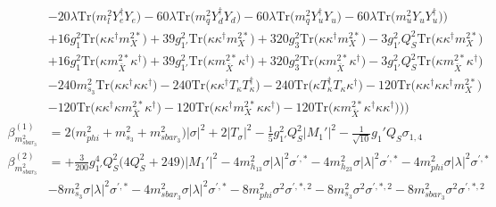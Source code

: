 {\begin{align}
 &-20 \lambda \mbox{Tr}\Big({m_l^2  Y_{e}^{\dagger}  Y_e}\Big) -60 \lambda \mbox{Tr}\Big({m_q^2  Y_{d}^{\dagger}  Y_d}\Big) -60 \lambda \mbox{Tr}\Big({m_q^2  Y_{u}^{\dagger}  Y_u}\Big) -60 \lambda \mbox{Tr}\Big({m_u^2  Y_u  Y_{u}^{\dagger}}\Big) \Big)\nonumber \\ 
 &+16 g_{1}^{2} \mbox{Tr}\Big({\kappa  \kappa^{\dagger}  m_{X}^{2 *}}\Big) +39 g_{1'}^{2} \mbox{Tr}\Big({\kappa  \kappa^{\dagger}  m_{X}^{2 *}}\Big) +320 g_{3}^{2} \mbox{Tr}\Big({\kappa  \kappa^{\dagger}  m_{X}^{2 *}}\Big) -3 g_{1'}^{2} Q_{S}^{2} \mbox{Tr}\Big({\kappa  \kappa^{\dagger}  m_{X}^{2 *}}\Big) \nonumber \\ 
 &+16 g_{1}^{2} \mbox{Tr}\Big({\kappa  m_{\bar{X}}^{2 *}  \kappa^{\dagger}}\Big) +39 g_{1'}^{2} \mbox{Tr}\Big({\kappa  m_{\bar{X}}^{2 *}  \kappa^{\dagger}}\Big) +320 g_{3}^{2} \mbox{Tr}\Big({\kappa  m_{\bar{X}}^{2 *}  \kappa^{\dagger}}\Big) -3 g_{1'}^{2} Q_{S}^{2} \mbox{Tr}\Big({\kappa  m_{\bar{X}}^{2 *}  \kappa^{\dagger}}\Big) \nonumber \\ 
 &-240 m_{s_3}^2 \mbox{Tr}\Big({\kappa  \kappa^{\dagger}  \kappa  \kappa^{\dagger}}\Big) -240 \mbox{Tr}\Big({\kappa  \kappa^{\dagger}  T_{\kappa}  T_{\kappa}^{\dagger}}\Big) -240 \mbox{Tr}\Big({\kappa  T_{\kappa}^{\dagger}  T_{\kappa}  \kappa^{\dagger}}\Big) -120 \mbox{Tr}\Big({\kappa  \kappa^{\dagger}  \kappa  \kappa^{\dagger}  m_{X}^{2 *}}\Big) \nonumber \\ 
 &-120 \mbox{Tr}\Big({\kappa  \kappa^{\dagger}  \kappa  m_{\bar{X}}^{2 *}  \kappa^{\dagger}}\Big) -120 \mbox{Tr}\Big({\kappa  \kappa^{\dagger}  m_{X}^{2 *}  \kappa  \kappa^{\dagger}}\Big) -120 \mbox{Tr}\Big({\kappa  m_{\bar{X}}^{2 *}  \kappa^{\dagger}  \kappa  \kappa^{\dagger}}\Big) \Big)\Big)\\ 
\beta_{m_{sbar_3}^2}^{(1)} & =  
2 \Big(m_{phi}^2 + m_{s_3}^2 + m_{sbar_3}^2\Big)|\sigma|^2  + 2 |T_{\sigma}|^2  -\frac{1}{5} g_{1'}^{2} Q_{S}^{2} |M_1'|^2  - \frac{1}{\sqrt{10}} g_1' Q_{S} \sigma_{1,4} \\ 
\beta_{m_{sbar_3}^2}^{(2)} & =  
+\frac{3}{200} g_{1'}^{4} Q_{S}^{2} \Big(4 Q_{S}^{2}  + 249\Big)|M_1'|^2 -4 m_{h_{13}}^2 \sigma |\lambda|^2 \sigma^{\prime,*} -4 m_{h_{23}}^2 \sigma |\lambda|^2 \sigma^{\prime,*} -4 m_{phi}^2 \sigma |\lambda|^2 \sigma^{\prime,*} \nonumber \\ 
 &-8 m_{s_3}^2 \sigma |\lambda|^2 \sigma^{\prime,*} -4 m_{sbar_3}^2 \sigma |\lambda|^2 \sigma^{\prime,*} -8 m_{phi}^2 \sigma^{2} \sigma^{\prime,*,2} -8 m_{s_3}^2 \sigma^{2} \sigma^{\prime,*,2} -8 m_{sbar_3}^2 \sigma^{2} \sigma^{\prime,*,2} \nonumber \\ 

\end{align}}
